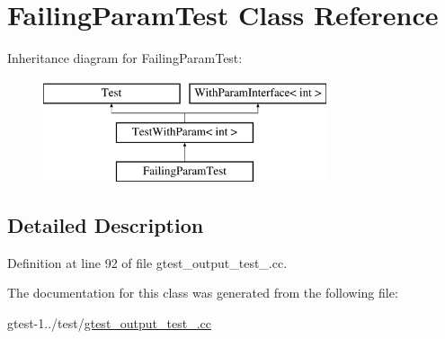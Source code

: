 \hypertarget{classFailingParamTest}{\section{\-Failing\-Param\-Test \-Class \-Reference}
\label{da/db9/classFailingParamTest}
}
\-Inheritance diagram for \-Failing\-Param\-Test\-:\begin{figure}[H]
\begin{center}
\leavevmode
\includegraphics[height=3.000000cm]{da/db9/classFailingParamTest}
\end{center}
\end{figure}


\subsection{\-Detailed \-Description}


\-Definition at line 92 of file gtest\-\_\-output\-\_\-test\-\_\-.\-cc.



\-The documentation for this class was generated from the following file\-:\begin{DoxyCompactItemize}
\item 
gtest-\/1../test/\hyperlink{gtest__output__test___8cc}{gtest\-\_\-output\-\_\-test\-\_\-.\-cc}\end{DoxyCompactItemize}
